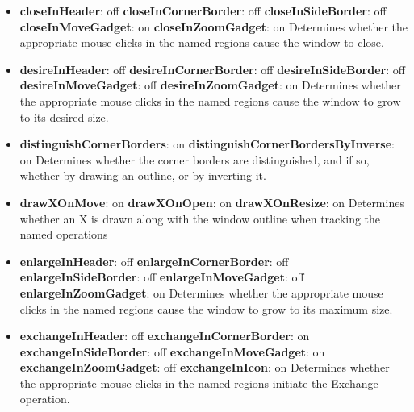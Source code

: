 \begin{itemize}
\item {\bf closeInHeader}: off\newline{}
{\bf closeInCornerBorder}: off\newline{}
{\bf closeInSideBorder}: off\newline{}
{\bf closeInMoveGadget}: on\newline{}
{\bf closeInZoomGadget}: on\newline{}
Determines whether the appropriate mouse clicks in the named
regions cause the window to close.

\item {\bf desireInHeader}: off\newline{}
{\bf desireInCornerBorder}: off\newline{}
{\bf desireInSideBorder}: off\newline{}
{\bf desireInMoveGadget}: off\newline{}
{\bf desireInZoomGadget}: on\newline{}
Determines whether the appropriate mouse clicks in the named
regions cause the window to grow to its desired size.

\item {\bf distinguishCornerBorders}: on\newline{}
{\bf distinguishCornerBordersByInverse}: on\newline{}
Determines whether the corner borders are distinguished, and if
so, whether by drawing an outline, or by inverting it.

\item {\bf drawXOnMove}: on\newline{}
{\bf drawXOnOpen}: on\newline{}
{\bf drawXOnResize}: on\newline{}
Determines whether an X is drawn along with the window outline
when tracking the named operations

\item {\bf enlargeInHeader}: off\newline{}
{\bf enlargeInCornerBorder}: off\newline{}
{\bf enlargeInSideBorder}: off\newline{}
{\bf enlargeInMoveGadget}: off\newline{}
{\bf enlargeInZoomGadget}: on\newline{}
Determines whether the appropriate mouse clicks in the named
regions cause the window to grow to its maximum size.

\item {\bf exchangeInHeader}: off\newline{}
{\bf exchangeInCornerBorder}: on\newline{}
{\bf exchangeInSideBorder}: off\newline{}
{\bf exchangeInMoveGadget}: on\newline{}
{\bf exchangeInZoomGadget}: off\newline{}
{\bf exchangeInIcon}: on\newline{}
Determines whether the appropriate mouse clicks in the named
regions initiate the Exchange operation.


\end{itemize}
